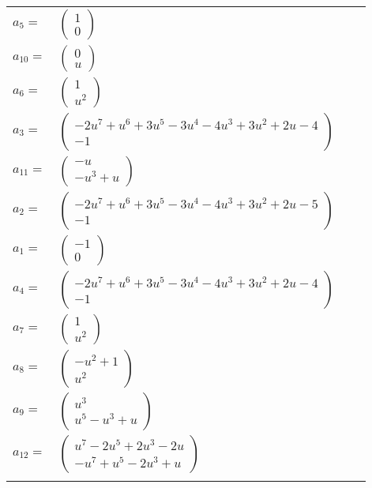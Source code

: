 \documentclass[1p]{elsarticle_modified}
\theoremstyle{definition}
\begin{document}
\begin{tabular}{m{7pt} m{180pt} m{7pt} m{180pt} }
\flushright $a_{5}=$&$\begin{pmatrix}1\\0\end{pmatrix}$ \\
\flushright $a_{10}=$&$\begin{pmatrix}0\\u\end{pmatrix}$ \\
\flushright $a_{6}=$&$\begin{pmatrix}1\\u^2\end{pmatrix}$ \\
\flushright $a_{3}=$&$\begin{pmatrix}-2 u^7+u^6+3 u^5-3 u^4-4 u^3+3 u^2+2 u-4\\-1\end{pmatrix}$ \\
\flushright $a_{11}=$&$\begin{pmatrix}- u\\- u^3+u\end{pmatrix}$ \\
\flushright $a_{2}=$&$\begin{pmatrix}-2 u^7+u^6+3 u^5-3 u^4-4 u^3+3 u^2+2 u-5\\-1\end{pmatrix}$ \\
\flushright $a_{1}=$&$\begin{pmatrix}-1\\0\end{pmatrix}$ \\
\flushright $a_{4}=$&$\begin{pmatrix}-2 u^7+u^6+3 u^5-3 u^4-4 u^3+3 u^2+2 u-4\\-1\end{pmatrix}$ \\
\flushright $a_{7}=$&$\begin{pmatrix}1\\u^2\end{pmatrix}$ \\
\flushright $a_{8}=$&$\begin{pmatrix}- u^2+1\\u^2\end{pmatrix}$ \\
\flushright $a_{9}=$&$\begin{pmatrix}u^3\\u^5- u^3+u\end{pmatrix}$ \\
\flushright $a_{12}=$&$\begin{pmatrix}u^7-2 u^5+2 u^3-2 u\\- u^7+u^5-2 u^3+u\end{pmatrix}$\\&\end{tabular}
\end{document}
